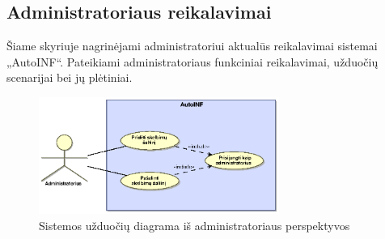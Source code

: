 \documentclass[12pt]{article}
\begin{document}
	\subsection{Administratoriaus reikalavimai}
	Šiame skyriuje nagrinėjami administratoriui aktualūs reikalavimai sistemai „AutoINF“. Pateikiami administratoriaus funkciniai reikalavimai, užduočių scenarijai bei jų plėtiniai.
	
	\begin{figure}[h]
		\begin{center}
			\includegraphics[width=0.7\textwidth]{TikslaiAdministratorius.eps}
			\caption{Sistemos užduočių diagrama iš administratoriaus perspektyvos\label{UseCaseAdmin}}
		\end{center}
	\end{figure}
	\pagebreak
	
\end{document}
